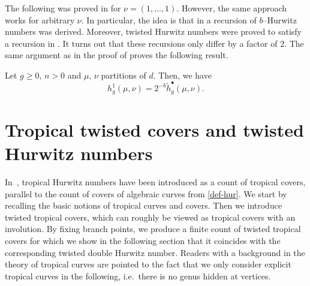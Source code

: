 The following was proved in \cite[Theorem 3.2]{BF21} for $\nu=(1,\dots,1)$. However, the same approach works for arbitrary $\nu$. In particular, the idea is that in \cite[Theorem 6.5]{chapuy2020non} a recursion of $b$--Hurwitz numbers was derived. Moreover, twisted Hurwitz numbers were proved to satisfy a recursion in \cite[Theorem 2.12]{BF21}. It turns out that these recursions only differ by a factor of $2$. The same argument as in the proof of \cite[Theorem 3.2]{BF21} proves the following result.

\begin{theo}
    Let $g\ge0$, $n>0$ and $\mu$, $\nu$ partitions of $d$. Then, we have
    \begin{equation*}
        h^1_g(\mu,\nu)=2^{-b}\tilde{h}_g^{\bullet}(\mu,\nu).
    \end{equation*}
\end{theo}

\section{Tropical twisted covers and twisted Hurwitz numbers}
\label{sec:troptwist}

In~\cite{CJM10}, tropical Hurwitz numbers have been introduced as a count of tropical covers, parallel to the count of covers of algebraic curves from \cref{def-hur}. We start by recalling the basic notions of tropical curves and covers. Then we introduce twisted tropical covers, which can roughly be viewed as tropical covers with an involution. By fixing branch points, we produce a finite count of twisted tropical covers for which we show in the following section that it coincides with the corresponding twisted double Hurwitz number. Readers with a background in the theory of tropical curves are pointed to the fact that we only consider explicit tropical curves in the following, i.e.\ there is no genus hidden at vertices.

